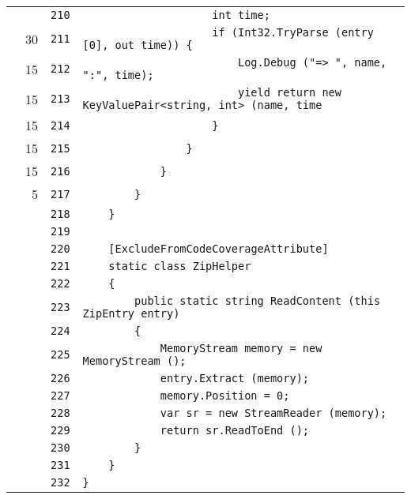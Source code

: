 \documentclass[a4paper,10pt]{article}
\begin{document}
\begin{longtable}[l]{lrrl}
\cellcolor{gray} &  & \verb~210~ & \verb~                    int time;~\\
\cellcolor{green} & 30 & \verb~211~ & \verb~                    if (Int32.TryParse (entry [0], out time)) {~\\
\cellcolor{green} & 15 & \verb~212~ & \verb~                        Log.Debug ("=> ", name, ":", time);~\\
\cellcolor{green} & 15 & \verb~213~ & \verb~                        yield return new KeyValuePair<string, int> (name, time~\\
\cellcolor{green} & 15 & \verb~214~ & \verb~                    }~\\
\cellcolor{green} & 15 & \verb~215~ & \verb~                }~\\
\cellcolor{green} & 15 & \verb~216~ & \verb~            }~\\
\cellcolor{green} & 5 & \verb~217~ & \verb~        }~\\
\cellcolor{gray} &  & \verb~218~ & \verb~    }~\\
\cellcolor{gray} &  & \verb~219~ & \verb~~\\
\cellcolor{gray} &  & \verb~220~ & \verb~    [ExcludeFromCodeCoverageAttribute]~\\
\cellcolor{gray} &  & \verb~221~ & \verb~    static class ZipHelper~\\
\cellcolor{gray} &  & \verb~222~ & \verb~    {~\\
\cellcolor{gray} &  & \verb~223~ & \verb~        public static string ReadContent (this ZipEntry entry)~\\
\cellcolor{gray} &  & \verb~224~ & \verb~        {~\\
\cellcolor{gray} &  & \verb~225~ & \verb~            MemoryStream memory = new MemoryStream ();~\\
\cellcolor{gray} &  & \verb~226~ & \verb~            entry.Extract (memory);~\\
\cellcolor{gray} &  & \verb~227~ & \verb~            memory.Position = 0;~\\
\cellcolor{gray} &  & \verb~228~ & \verb~            var sr = new StreamReader (memory);~\\
\cellcolor{gray} &  & \verb~229~ & \verb~            return sr.ReadToEnd ();~\\
\cellcolor{gray} &  & \verb~230~ & \verb~        }~\\
\cellcolor{gray} &  & \verb~231~ & \verb~    }~\\
\cellcolor{gray} &  & \verb~232~ & \verb~}~\\
\end{longtable}
\newpage
\end{document}
